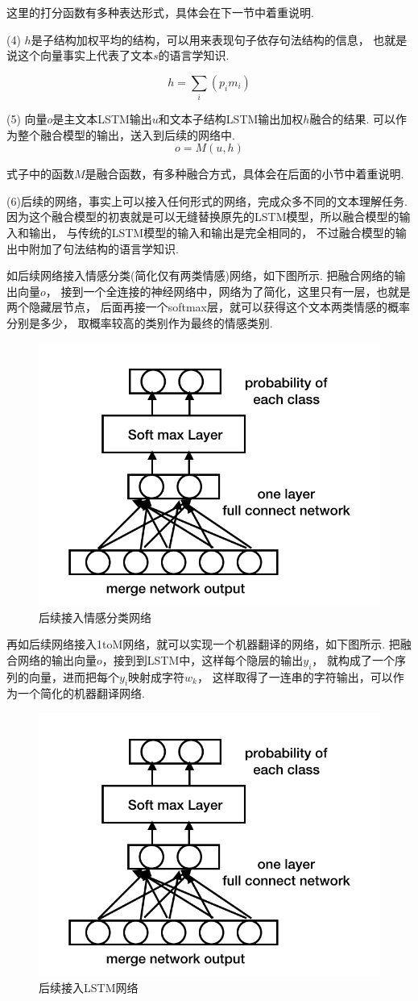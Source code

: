 \documentclass[bachelor,adobefonts]{jnuthesis}
\begin{document}
这里的打分函数有多种表达形式，具体会在下一节中着重说明.

(4)
$h$是子结构加权平均的结构，可以用来表现句子依存句法结构的信息，
也就是说这个向量事实上代表了文本$s$的语言学知识.

\begin{equation}
  h = \sum_{i}(p_{i}m_{i})
\end{equation}

(5)
向量$o$是主文本LSTM输出$u$和文本子结构LSTM输出加权$h$融合的结果.
可以作为整个融合模型的输出，送入到后续的网络中.
\begin{equation}
  o = M(u,h)
\end{equation}

式子中的函数$M$是融合函数，有多种融合方式，具体会在后面的小节中着重说明.

(6)后续的网络，事实上可以接入任何形式的网络，完成众多不同的文本理解任务.
因为这个融合模型的初衷就是可以无缝替换原先的LSTM模型，所以融合模型的输入和输出，
与传统的LSTM模型的输入和输出是完全相同的，
不过融合模型的输出中附加了句法结构的语言学知识.

如后续网络接入情感分类(简化仅有两类情感)网络，如下图所示.
把融合网络的输出向量$o$，
接到一个全连接的神经网络中，网络为了简化，这里只有一层，也就是两个隐藏层节点，
后面再接一个softmax层，就可以获得这个文本两类情感的概率分别是多少，
取概率较高的类别作为最终的情感类别.
\begin{figure}[h!]
  \centering
  \includegraphics[width=0.5\linewidth]{erfenlei.png}
  \caption{后续接入情感分类网络}
\end{figure}

再如后续网络接入1toM网络，就可以实现一个机器翻译的网络，如下图所示.
把融合网络的输出向量$o$，接到到LSTM中，这样每个隐层的输出$y_{i}$，
就构成了一个序列的向量，进而把每个$y_{i}$映射成字符$w_{k}$，
这样取得了一连串的字符输出，可以作为一个简化的机器翻译网络.

\begin{figure}[h!]
  \centering
  \includegraphics[width=0.5\linewidth]{erfenlei.png}
  \caption{后续接入LSTM网络}
\end{figure}
\end{document}
